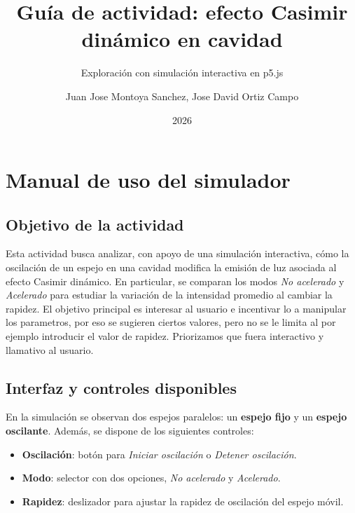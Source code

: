 \documentclass{aa}
\begin{document}
\title{Guía de actividad: efecto Casimir dinámico en cavidad}

\subtitle{Exploración con simulación interactiva en p5.js}

\author{Juan Jose Montoya Sanchez, Jose David Ortiz Campo}


\date{2026}

\maketitle

\section{Manual de uso del simulador}

\subsection{Objetivo de la actividad}

Esta actividad busca analizar, con apoyo de una simulación interactiva, cómo la oscilación de un espejo en una cavidad modifica la emisión de luz asociada al efecto Casimir dinámico. En particular, se comparan los modos \emph{No acelerado} y \emph{Acelerado} para estudiar la variación de la intensidad promedio al cambiar la rapidez.
El objetivo principal es interesar al usuario e incentivar lo a manipular los parametros, por eso se sugieren ciertos valores, pero no se le limita al por ejemplo introducir el valor de rapidez. Priorizamos que fuera interactivo y llamativo al usuario.

\subsection{Interfaz y controles disponibles}

En la simulación se observan dos espejos paralelos: un \textbf{espejo fijo} y un \textbf{espejo oscilante}. Además, se dispone de los siguientes controles:

\begin{itemize}
  \item \textbf{Oscilación}: botón para \emph{Iniciar oscilación} o \emph{Detener oscilación}.
  \item \textbf{Modo}: selector con dos opciones, \emph{No acelerado} y \emph{Acelerado}.
  \item \textbf{Rapidez}: deslizador para ajustar la rapidez de oscilación del espejo móvil.
\end{itemize}
\end{document}
